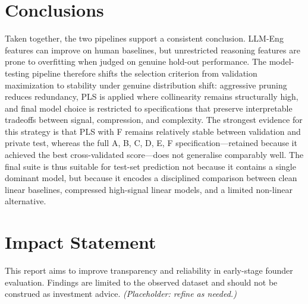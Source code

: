 \documentclass{article}
\theoremstyle{plain}
\theoremstyle{definition}
\theoremstyle{remark}
\begin{document}
\section{Conclusions}
Taken together, the two pipelines support a consistent conclusion. LLM-Eng features can improve on human baselines, but unrestricted reasoning features are prone to overfitting when judged on genuine hold-out performance. The model-testing pipeline therefore shifts the selection criterion from validation maximization to stability under genuine distribution shift: aggressive pruning reduces redundancy, PLS is applied where collinearity remains structurally high, and final model choice is restricted to specifications that preserve interpretable tradeoffs between signal, compression, and complexity. The strongest evidence for this strategy is that PLS with F remains relatively stable between validation and private test, whereas the full A, B, C, D, E, F specification---retained because it achieved the best cross-validated score---does not generalise comparably well. The final suite is thus suitable for test-set prediction not because it contains a single dominant model, but because it encodes a disciplined comparison between clean linear baselines, compressed high-signal linear models, and a limited non-linear alternative.

\section*{Impact Statement}
This report aims to improve transparency and reliability in early-stage founder evaluation. Findings are limited to the observed dataset and should not be construed as investment advice. \textit{(Placeholder: refine as needed.)}









\end{document}
